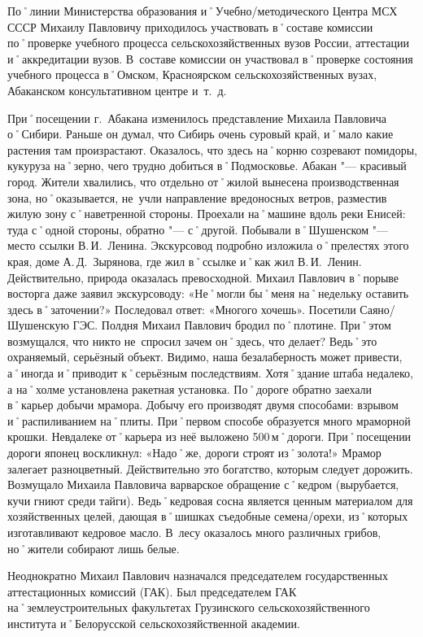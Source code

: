 По˚линии Министерства образования и˚Учебно\-/методического Центра МСХ СССР Михаилу Павловичу приходилось  участвовать в˚составе комиссии по˚проверке учебного процесса сельскохозяйственных вузов России, аттестации и˚аккредитации вузов. В~составе комиссии он участвовал в˚проверке состояния учебного процесса в˚Омском, Красноярском сельскохозяйственных вузах, Абаканском консультативном центре и~т.~д.

При˚посещении г.~Абакана изменилось представление Михаила Павловича о˚Сибири. Раньше он думал, что Сибирь очень суровый край, и˚мало какие растения там произрастают. Оказалось, что здесь на˚корню созревают помидоры, кукуруза на˚зерно, чего трудно добиться в˚Подмосковье. Абакан "--- красивый город. Жители хвалились, что отдельно от˚жилой вынесена производственная зона, но˚оказывается, не~учли направление вредоносных ветров, разместив жилую зону с˚наветренной стороны. Проехали на˚машине вдоль реки Енисей: туда с˚одной стороны, обратно "--- с˚другой. Побывали в˚Шушенском "--- место ссылки В.\,И.~Ленина. Экскурсовод подробно изложила о˚прелестях этого края, доме А.\,Д.~Зырянова, где жил в˚ссылке и˚как жил В.\,И.~Ленин. Действительно, природа оказалась превосходной. Михаил Павлович в˚порыве восторга даже заявил экскурсоводу: «Не˚могли бы˚меня на˚недельку оставить здесь в˚заточении?» Последовал ответ: «Многого хочешь». Посетили Саяно\-/Шушенскую ГЭС. Полдня Михаил Павлович бродил по˚плотине. При˚этом возмущался, что никто не~спросил зачем он˚здесь, что делает? Ведь˚это охраняемый, серьёзный объект. Видимо, наша безалаберность может привести, а˚иногда и˚приводит к˚серьёзным последствиям. Хотя˚здание штаба недалеко, а на˚холме установлена ракетная установка. По˚дороге обратно заехали в˚карьер добычи мрамора. Добычу его производят двумя способами: взрывом и˚распиливанием на˚плиты. При˚первом способе образуется много мраморной крошки. Невдалеке от˚карьера из неё выложено 500\,м˚дороги. При˚посещении дороги японец воскликнул: «Надо˚же, дороги строят из˚золота!» Мрамор залегает разноцветный. Действительно это богатство, которым следует дорожить. Возмущало Михаила Павловича варварское обращение с˚кедром (вырубается, кучи гниют среди тайги). Ведь˚кедровая сосна является ценным материалом для хозяйственных целей, дающая в˚шишках съедобные семена\-/орехи, из˚которых изготавливают кедровое масло. В~лесу оказалось много различных грибов, но˚жители собирают лишь белые.

Неоднократно Михаил Павлович назначался председателем государственных аттестационных комиссий (ГАК). Был председателем ГАК на˚землеустроительных факультетах Грузинского сельскохозяйственного института и˚Белорусской сельскохозяйственной академии. 

